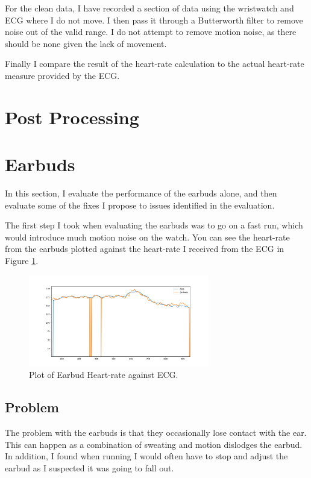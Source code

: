 \documentclass[12pt,a4paper,twoside,openright]{report}
\begin{document}
For the clean data, I have recorded a section of data using the wristwatch and ECG
where I do not move. I then pass it through a Butterworth filter to remove
noise out of the valid range. I do not attempt to remove motion noise, as
there should be none given the lack of movement.

Finally I compare the result of the heart-rate calculation to the actual
heart-rate measure provided by the ECG.

\section{Post Processing}

\section{Earbuds}

In this section, I evaluate the performance of the earbuds alone, and then
evaluate some of the fixes I propose to issues identified in the evaluation.

The first step I took when evaluating the earbuds was to go on a fast run,
which would introduce much motion noise on the watch. You can see the
heart-rate from the earbuds plotted against the heart-rate I received from the
ECG in Figure \ref{fig:earbud-fast}.

\begin{figure}[tbh]
	\centerline{\includegraphics[width=0.7\textwidth]{figs/earbud-fast-graph.png}}
	\caption{Plot of Earbud Heart-rate against ECG.}
	\label{fig:earbud-fast}
\end{figure}

\subsection{Problem} \label{section:earbud-problem}

The problem with the earbuds is that they occasionally lose contact with the
ear. This can happen as a combination of sweating and motion dislodges the
earbud. In addition, I found when running I would often have to stop and
adjust the earbud as I suspected it was going to fall out. 
\end{document}
